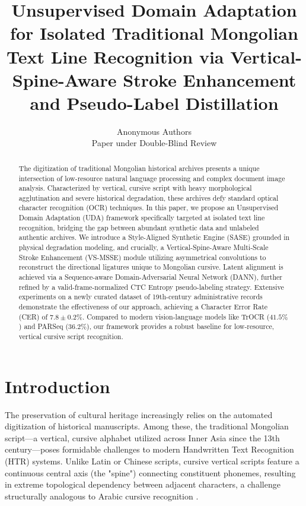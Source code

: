 \documentclass[11pt]{article}
\title{\LARGE \textbf{Unsupervised Domain Adaptation for Isolated Traditional Mongolian Text Line Recognition via Vertical-Spine-Aware Stroke Enhancement and Pseudo-Label Distillation}}
\author{
Anonymous Authors \\
\small Paper under Double-Blind Review
}
\date{}
\begin{document}
\maketitle

\begin{abstract}
The digitization of traditional Mongolian historical archives presents a unique intersection of low-resource natural language processing and complex document image analysis. Characterized by vertical, cursive script with heavy morphological agglutination and severe historical degradation, these archives defy standard optical character recognition (OCR) techniques. In this paper, we propose an Unsupervised Domain Adaptation (UDA) framework specifically targeted at isolated text line recognition, bridging the gap between abundant synthetic data and unlabeled authentic archives. We introduce a Style-Aligned Synthetic Engine (SASE) grounded in physical degradation modeling, and crucially, a Vertical-Spine-Aware Multi-Scale Stroke Enhancement (VS-MSSE) module utilizing asymmetrical convolutions to reconstruct the directional ligatures unique to Mongolian cursive. Latent alignment is achieved via a Sequence-aware Domain-Adversarial Neural Network (DANN), further refined by a valid-frame-normalized CTC Entropy pseudo-labeling strategy. Extensive experiments on a newly curated dataset of 19th-century administrative records demonstrate the effectiveness of our approach, achieving a Character Error Rate (CER) of $7.8 \pm 0.2\%$. Compared to modern vision-language models like TrOCR ($41.5\%$) and PARSeq ($36.2\%$), our framework provides a robust baseline for low-resource, vertical cursive script recognition.
\end{abstract}

\section{Introduction}

The preservation of cultural heritage increasingly relies on the automated digitization of historical manuscripts. Among these, the traditional Mongolian script—a vertical, cursive alphabet utilized across Inner Asia since the 13th century—poses formidable challenges to modern Handwritten Text Recognition (HTR) systems. Unlike Latin or Chinese scripts, cursive vertical scripts feature a continuous central axis (the "spine") connecting constituent phonemes, resulting in extreme topological dependency between adjacent characters, a challenge structurally analogous to Arabic cursive recognition \cite{parvez2013arabic}. 
\end{document}
